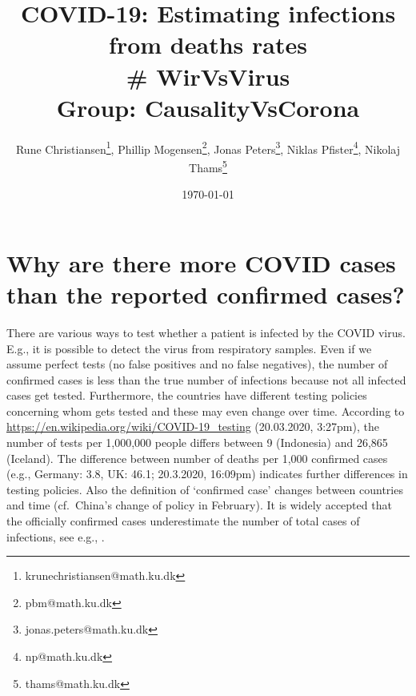 \documentclass[a4paper]{article}
\title{COVID-19: Estimating infections from deaths rates \\ \# WirVsVirus\\
Group: CausalityVsCorona}
\author{Rune Christiansen\thanks{krunechristiansen@math.ku.dk}, Phillip Mogensen\thanks{pbm@math.ku.dk}, Jonas Peters\thanks{jonas.peters@math.ku.dk}, Niklas Pfister\thanks{np@math.ku.dk}, Nikolaj Thams\thanks{thams@math.ku.dk}}
\date{\today}
\newcommand\todo[1]{{\color{red}todo: #1}}
\begin{document}
\maketitle


\begin{center}
\end{center}



\section{Why are there more COVID cases 
than the reported confirmed cases?}
There are various ways to test whether a patient is infected by the
COVID virus. E.g., it is possible to detect the virus from respiratory
samples.  Even if we assume perfect tests (no false positives and no
false negatives), the number of confirmed cases is less than the true
number of infections because not all infected cases get tested.
Furthermore, the countries have different testing policies concerning
whom gets tested and these may even change over time.  According to
\url{https://en.wikipedia.org/wiki/COVID-19_testing} (20.03.2020,
3:27pm), the number of tests per 1,000,000 people differs between 9
(Indonesia) and 26,865 (Iceland).  The difference between number of
deaths per 1,000 confirmed cases (e.g., Germany: 3.8, UK: 46.1;
20.3.2020, 16:09pm) indicates further differences in testing policies.
Also the definition of `confirmed case' changes between countries and
time (cf.\ China's change of policy in February).
It is widely accepted that the officially confirmed cases
underestimate the number of total cases of infections, see e.g.,
\cite{li2020substantial}.
\end{document}
